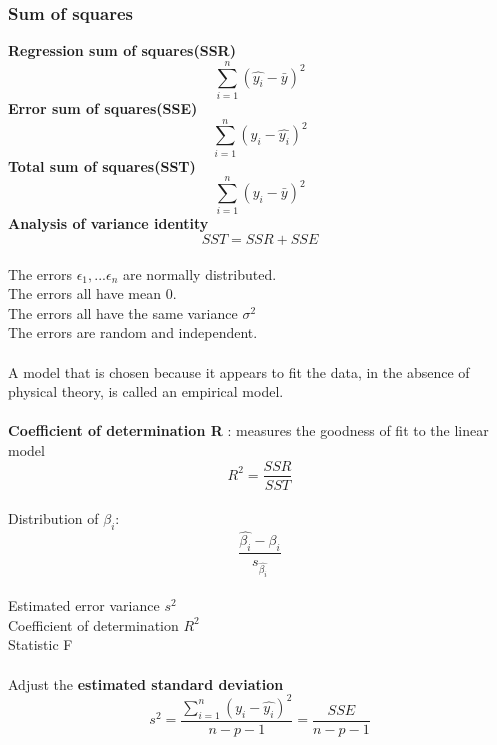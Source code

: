 \documentclass[../main.tex]{subfiles}
\begin{document}
\subsubsection*{Sum of squares}
\textbf{Regression sum of squares(SSR)}
$$\sum_{i=1}^{n}(\hat{y_i}-\bar y)^2$$
\textbf{Error sum of squares(SSE)}
$$\sum_{i=1}^{n}(y_i-\hat{ y_i})^2$$
\textbf{Total sum of squares(SST)}
$$\sum_{i=1}^{n}({y_i}-\bar y)^2$$
\textbf{Analysis of variance identity}
$$SST=SSR+SSE$$\\
The errors $\epsilon_1,...\epsilon_n$ are normally distributed.\\
The errors all have mean 0.\\
The errors all have the same variance $\sigma^2$\\
The errors are random and independent.\\\\
A model that is chosen because it appears to fit the data, in the absence of physical theory, is called an empirical model.\\\\
\textbf{Coefficient of determination R }: measures the goodness of fit to the linear model
$$R^2 = \frac{SSR}{SST}$$\\
Distribution of $\beta_i$: $$\frac{\hat{\beta_i}-\beta_i}{s_{\hat{\beta_i}}}$$\\
Estimated error variance $s^2$\\
Coefficient of determination $R^2$\\
Statistic F\\\\
Adjust the \textbf{estimated standard deviation}
\begin{equation*}
    s^2 = \frac{\sum_{i=1}^{n}(y_i-\hat{ y_i})^2}{n-p-1}=\frac{SSE}{n-p-1}
\end{equation*}
\end{document}
